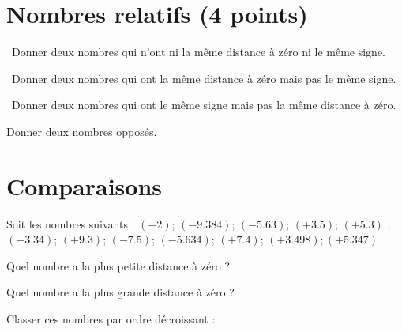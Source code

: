 \section{Nombres relatifs (4 points)} 

\begin{questions}
	

	\question[1]  Donner deux nombres qui n'ont ni la même distance à zéro ni le même signe.
	\fillwithdottedlines{1cm}	
	
	\question[1]  Donner deux nombres qui ont la même distance à zéro mais pas le même signe.
	\fillwithdottedlines{1cm}
	
	\question[1]  Donner deux nombres qui ont le même signe mais pas la même distance à zéro.
	\fillwithdottedlines{1cm}
	
	
	
	\question[1] Donner deux nombres opposés.
	\fillwithdottedlines{1cm}
\end{questions}



\section{Comparaisons}

Soit les nombres suivants :
$(-2)$; $(-\num{9.384})$; $(-\num{5.63})$; $(+\num{3.5})$; $(+\num{5.3})$ ; $(-\num{3.34})$; $(+\num{9.3})$; $(-\num{7.5})$; $(-\num{5.634})$; $(+\num{7.4}) $; $(+ \num{3.498} ); (+\num{5.347})$ 

\begin{questions}
	\question[1] Quel nombre a la plus petite distance à zéro ?
	\fillwithdottedlines{1cm}
	
	\question[1] Quel nombre a la plus grande distance à zéro ?
	\fillwithdottedlines{1cm}
	
	\question[2] Classer ces nombres par ordre décroissant :
	\fillwithdottedlines{2cm}
\end{questions}

